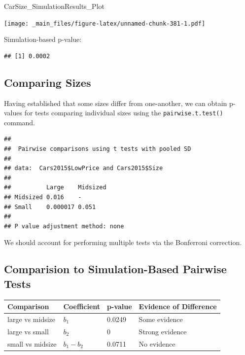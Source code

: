\documentclass[]{book}
\newenvironment{Shaded}{\begin{snugshade}}{\end{snugshade}}
\newcommand{\KeywordTok}[1]{\textcolor[rgb]{0.13,0.29,0.53}{\textbf{#1}}}
\newcommand{\DataTypeTok}[1]{\textcolor[rgb]{0.13,0.29,0.53}{#1}}
\newcommand{\StringTok}[1]{\textcolor[rgb]{0.31,0.60,0.02}{#1}}
\newcommand{\OperatorTok}[1]{\textcolor[rgb]{0.81,0.36,0.00}{\textbf{#1}}}
\newcommand{\NormalTok}[1]{#1}
\begin{document}
\begin{Shaded}
\begin{Highlighting}[]
\NormalTok{CarSize_SimulationResults_Plot}
\end{Highlighting}
\end{Shaded}

\texttt{[image: \_main\_files/figure-latex/unnamed-chunk-381-1.pdf]}

Simulation-based p-value:

\begin{verbatim}
## [1] 0.0002
\end{verbatim}

\subsection{Comparing Sizes}\label{comparing-sizes}

Having established that some sizes differ from one-another, we can
obtain p-values for tests comparing individual sizes using the
\texttt{pairwise.t.test()} command.

\begin{Shaded}
\end{Shaded}

\begin{verbatim}
## 
##  Pairwise comparisons using t tests with pooled SD 
## 
## data:  Cars2015$LowPrice and Cars2015$Size 
## 
##          Large    Midsized
## Midsized 0.016    -       
## Small    0.000017 0.051   
## 
## P value adjustment method: none
\end{verbatim}

We should account for performing multiple tests via the Bonferroni
correction.

\subsection{Comparision to Simulation-Based Pairwise
Tests}\label{comparision-to-simulation-based-pairwise-tests}

\begin{longtable}[]{@{}llll@{}}
\toprule
Comparison & Coefficient & p-value & Evidence of
Difference\tabularnewline
\midrule
\endhead
large vs midsize & \(b_1\) & 0.0249 & Some evidence\tabularnewline
large vs small & \(b_2\) & 0 & Strong evidence\tabularnewline
small vs midsize & \(b_1-b_2\) & 0.0711 & No evidence\tabularnewline
\bottomrule
\end{longtable}
\end{document}
